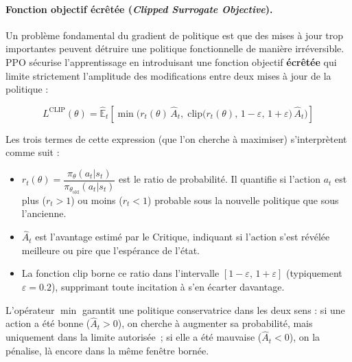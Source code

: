 \paragraph{Fonction objectif écrêtée (\textit{Clipped Surrogate Objective}).}
Un problème fondamental du gradient de politique est que des mises à jour trop
importantes peuvent détruire une politique fonctionnelle de manière
irréversible. PPO sécurise l'apprentissage en introduisant une fonction
objectif \textbf{écrêtée} qui limite
strictement l'amplitude des modifications entre deux mises à jour de la
politique :
 
\begin{equation}
    \label{eq:ppo_clip}
    L^{\text{CLIP}}(\theta) = \hat{\mathbb{E}}_t \left[
        \min\!\Big(r_t(\theta)\,\hat{A}_t,\;
        \text{clip}\!\big(r_t(\theta),\,1-\varepsilon,\,1+\varepsilon\big)\,\hat{A}_t
        \Big)
    \right]
\end{equation}
 
\noindent Les trois termes de cette expression (que l'on cherche à maximiser)
s'interprètent comme suit :
\begin{itemize}
    \item $r_t(\theta) = \dfrac{\pi_\theta(a_t|s_t)}{\pi_{\theta_{\text{old}}}(a_t|s_t)}$
          est le ratio de probabilité. Il quantifie si l'action $a_t$ est plus
          ($r_t > 1$) ou moins ($r_t < 1$) probable sous la nouvelle politique
          que sous l'ancienne.
    \item $\hat{A}_t$ est l'avantage estimé par le Critique, indiquant si
          l'action s'est révélée meilleure ou pire que l'espérance de l'état.
    \item La fonction $\text{clip}$ borne ce ratio dans l'intervalle
          $[1-\varepsilon,\, 1+\varepsilon]$ (typiquement $\varepsilon = 0.2$),
          supprimant toute incitation à s'en écarter davantage.
\end{itemize}
 
L'opérateur $\min$ garantit une politique conservatrice dans les deux sens :
si une action a été bonne ($\hat{A}_t > 0$), on cherche à augmenter sa
probabilité, mais uniquement dans la limite autorisée~; si elle a été mauvaise
($\hat{A}_t < 0$), on la pénalise, là encore dans la même fenêtre bornée.
 
